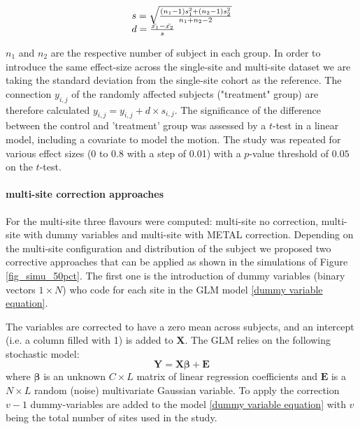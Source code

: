 \begin{equation}\label{cohen's d}
    \begin{array}{l l}
      s = \sqrt{\frac{(n_{1}-1)s_{1}^{2}+(n_{2}-1)s_{2}^{2}}{n_{1}+n_{2}-2}} \\
      d = \frac{\bar{x_{1}}-\bar{x_{2}}}{s}
    \end{array}
\end{equation}

$n_{1}$ and $n_{2}$ are the respective number of subject in each group. In order to introduce the same effect-size across the single-site and multi-site dataset we are taking the standard deviation from the single-site cohort as the reference.  The connection $y_{i,j}$ of the randomly affected subjects ("treatment" group) are therefore calculated $y_{i,j} = y_{i,j} + d\times s_{i,j}$. The significance of the difference between the control and 'treatment' group was assessed by a $t$-test in a linear model, including a covariate to model the motion. The study was repeated for various effect sizes (0 to 0.8 with a step of 0.01) with a $p$-value threshold of $0.05$ on the $t$-test.

\paragraph{multi-site correction approaches} 

For the multi-site three flavours were computed: multi-site no correction, multi-site with dummy variables and multi-site with METAL correction.
Depending on the multi-site configuration and distribution of the subject we proposed two corrective approaches that can be applied as shown in the simulations of Figure \ref{fig_simu_50pct}. The first one is the introduction of dummy variables (binary vectors $1\times N$) who code for each site in the GLM model \ref{dummy variable equation}.

The variables are corrected to have a zero mean across subjects, and an intercept (i.e. a column filled with 1) is added to $\mathbf{X}$. The GLM relies on the following stochastic model:
 \begin{equation}
 \label{eq_glm}
  \mathbf{Y} = \mathbf{X}\mathbf{\beta} + \mathbf{E}
 \end{equation}
where $\mathbf{\beta}$ is an unknown $C\times L$ matrix of linear regression coefficients and $\mathbf{E}$ is a $N\times L$ random (noise) multivariate Gaussian variable. %
To apply the correction $v-1$ dummy-variables are added to the model \ref{dummy variable equation} with $v$ being the total number of sites used in the study.

